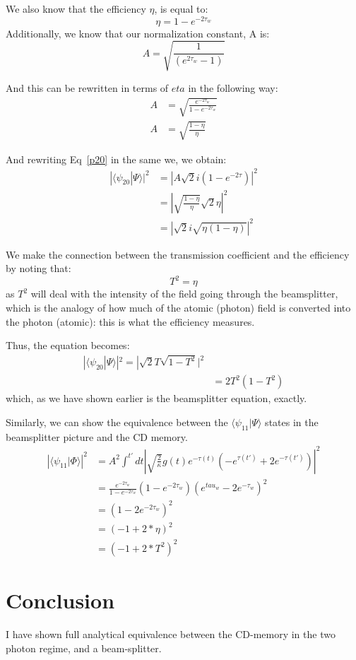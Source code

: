\documentclass[12pt]{article}
\begin{document}
We also know that the efficiency $\eta$, is equal to:
\begin{equation}
\eta = 1-e^{-2\tau_w}
\end{equation}
Additionally, we know that our normalization constant, A is:
\begin{equation}
A = \sqrt{\frac{1}{\left(  e^{2\tau_w} -1\right)}}
\end{equation}

And this can be rewritten in terms of $eta$ in the following way:
\begin{align}
A &= \sqrt{\frac{e^{-2\tau_w}}{1-e^{-2\tau_w}}}\\
A &=\sqrt{ \frac{1-\eta}{\eta}}
\end{align}

And rewriting Eq~\eqref{p20} in the same we, we obtain:
\begin{align}
|\langle \psi_{20}| \Psi \rangle|^2&= |A  \sqrt{2} i (1-e^{-2\tau})|^2\\
&=| \sqrt{\frac{1-\eta}{\eta}} \sqrt{2} \eta|^2\\ 
&= |  \sqrt{2} i \sqrt{ \eta (1-\eta)}|^2
\end{align}

We make the connection between the transmission coefficient and the efficiency by noting that:
\[
T^2 = \eta
\]
as $T^2$ will deal with the intensity of the field going through the beamsplitter, which is the analogy of how much of the atomic (photon) field is converted into the photon (atomic): this is what the efficiency measures.

Thus, the equation becomes:
\begin{align}
|\langle \psi_{20} | \Psi \rangle|^2 = | \sqrt{2} T\sqrt{1-T^2}|^2 \\
&= 2T^2 (1-T^2)
\end{align}
which, as we have shown earlier is the beamsplitter equation, exactly.

Similarly, we can show the equivalence between the $\langle \psi_{11} | \Psi \rangle$ states in the beamsplitter picture and the CD memory.
\begin{align}
\left | \langle \psi_{11} | \Phi \rangle \right | ^2  &= A^2\int^{t'} dt \left|\sqrt{\frac{2}{\kappa}} g(t) e^{-\tau(t)} \left (- e^{\tau(t')} +2 e^{-\tau(t')} \right ) \right |^2 \\
&= \frac{e^{-2\tau_w}}{1-e^{-2\tau_w}} \left (1- e^{-2\tau_w} \right ) \left ( e^{tau_w}-2e^{-\tau_w} \right )^2\\
&=  \left( 1-2e^{-2\tau_w} \right )^2\\
&= \left ( -1+2*\eta \right )^2\\
&= \left (-1+2*T^2 \right )^2
\end{align}

\section{Conclusion}
I have shown full analytical equivalence between the CD-memory in the two photon regime, and a beam-splitter.
\end{document}
